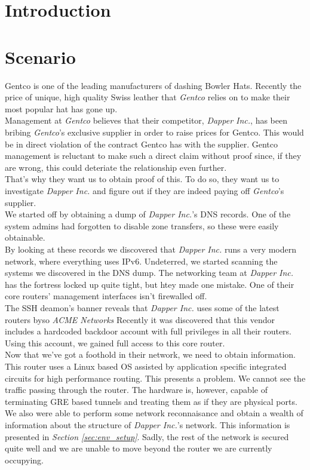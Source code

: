 \documentclass[11pt,a4paper,oneside]{article}
\title{\ftitle\\\coursecode { -} \coursename}
\author{\fauthor}
\newcommand{\lsection}[2]{\section{#1}\label{sec:#2}}
\begin{document}
    \maketitle\thispagestyle{fancy}
    \newpage
    \tableofcontents
    \newpage
    
    
    \lsection{Introduction}{intro}
    	
    	
    \lsection{Scenario}{scenario}
    		Gentco is one of the leading manufacturers of dashing Bowler Hats. Recently the price of unique, high quality Swiss leather that \textit{Gentco} relies on to make their most popular hat has gone up.\\
    		Management at \textit{Gentco} believes that their competitor, \textit{Dapper Inc.}, has been bribing \textit{Gentco}'s exclusive supplier in order to raise prices for Gentco. This would be in direct violation of the contract Gentco has with the supplier. Gentco management is reluctant to make such a direct claim without proof since, if they are wrong, this could deteriate the relationship even further.\\
    		That's why they want us to obtain proof of this. To do so, they want us to investigate \textit{Dapper Inc.} and figure out if they are indeed paying off \textit{Gentco}'s supplier.\\
    		We started off by obtaining a dump of \textit{Dapper Inc.}'s DNS records. One of the system admins had forgotten to disable zone transfers, so these were easily obtainable.\\
    		By looking at these records we discovered that \textit{Dapper Inc.} runs a very modern network, where everything uses IPv6. Undeterred, we started scanning the systems we discovered in the DNS dump. The networking team at \textit{Dapper Inc.} has the fortress locked up quite tight, but htey made one mistake. One of their core routers' management interfaces isn't firewalled off.\\
    		The SSH deamon's banner reveals that \textit{Dapper Inc.} uses some of the latest routers byso \textit{ACME Networks} Recently it was discovered that this vendor includes a hardcoded backdoor account with full privileges in all their routers. Using this account, we gained full access to this core router.\\
    		Now that we've got a foothold in their network, we need to obtain information. This router uses a Linux based OS assisted by application specific integrated circuits for high performance routing. This presents a problem. We cannot see the traffic passing through the router. The hardware is, however, capable of terminating GRE based tunnels and treating them as if they are physical ports. We also were able to perform some network reconnaisance and obtain a wealth of information about the structure of \textit{Dapper Inc.}'s network. This information is presented in \textit{Section \ref{sec:env_setup}}. Sadly, the rest of the network is secured quite well and we are unable to move beyond the router we are currently occupying.\\
\end{document}
